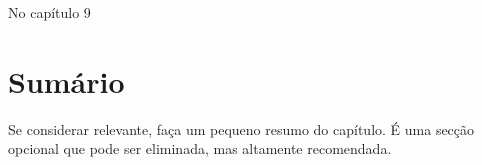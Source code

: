 No capítulo 9




\section*{Sumário}
\label{sec:intro_summary}
Se considerar relevante, faça um pequeno resumo do capítulo. É uma secção opcional que pode ser eliminada, mas altamente recomendada.
\\
\\
\\
\\
